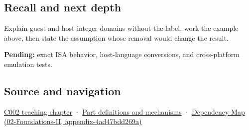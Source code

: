 \subsection{Recall and next depth}\label{recall-and-next-depth}

Explain guest and host integer domains without the label, work the example above, then state the assumption whose removal would change the result.

\textbf{Pending:} exact ISA behavior, host-language conversions, and cross-platform emulation tests.

\subsection{Source and navigation}\label{source-and-navigation}

\href{Continuous\%20Notes/Computing\%20Foundations\%20-\%20From\%20Bits\%20to\%20C++\%20and\%20Systems\%20APIs\#Arithmetic\%20becomes\%20a\%20policy}{C002 teaching chapter} · \hyperref[appendix-fd090d982a15]{Part definitions and mechanisms} · \href{}{Dependency Map (02-Foundations-II, appendix-4ad47bdd269a)}
